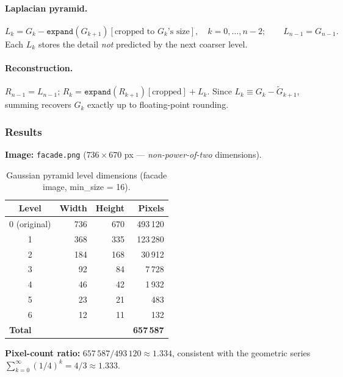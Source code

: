 \documentclass[12pt,a4paper]{article}
\begin{document}
\paragraph{Laplacian pyramid.}
\begin{equation}
  L_k = G_k - \texttt{expand}(G_{k+1})[\text{cropped to }G_k\text{'s size}],
  \quad k=0,\ldots,n-2;\qquad
  L_{n-1} = G_{n-1}.
  \label{eq:lap}
\end{equation}
Each $L_k$ stores the detail \emph{not} predicted by the next coarser level.

\paragraph{Reconstruction.}
$R_{n-1} = L_{n-1}$;\quad
$R_k = \texttt{expand}(R_{k+1})[\text{cropped}] + L_k$.
Since $L_k \equiv G_k - \widetilde{G}_{k+1}$, summing recovers $G_k$ exactly
up to floating-point rounding.

\subsubsection{Results}

\textbf{Image:} \texttt{facade.png} ($736\times670$ px ---
\emph{non-power-of-two} dimensions).

\begin{table}[H]
  \centering
  \caption{Gaussian pyramid level dimensions (facade image, min\_size = 16).}
  \label{tab:gpyramid}
  \begin{tabular}{crrr}
    \toprule
    \textbf{Level} & \textbf{Width} & \textbf{Height} & \textbf{Pixels} \\
    \midrule
    0 (original) & 736 & 670 & 493\,120 \\
    1 & 368 & 335 & 123\,280 \\
    2 & 184 & 168 &  30\,912 \\
    3 &  92 &  84 &   7\,728 \\
    4 &  46 &  42 &   1\,932 \\
    5 &  23 &  21 &     483 \\
    6 &  12 &  11 &     132 \\
    \midrule
    \multicolumn{3}{l}{\textbf{Total}} & \textbf{657\,587} \\
    \bottomrule
  \end{tabular}
\end{table}

\textbf{Pixel-count ratio:}
$657\,587 / 493\,120 \approx 1.334$, consistent with the geometric series
$\sum_{k=0}^{\infty}(1/4)^k = 4/3 \approx 1.333$.
\end{document}
